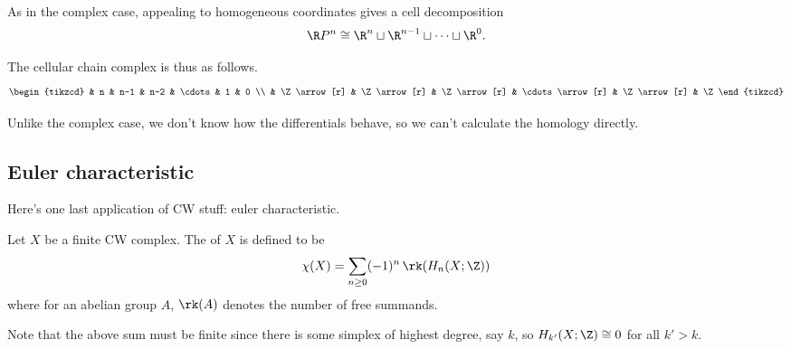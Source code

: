 \documentclass[main.tex]{subfiles}
\begin{document}
\begin{example}
  As in the complex case, appealing to homogeneous coordinates gives a cell decomposition
  \begin{equation*}
    \R P^{n} \cong \R^{n} \sqcup \R^{n-1} \sqcup \cdots \sqcup \R^{0}.
  \end{equation*}

  The cellular chain complex is thus as follows.
  \begin{equation*}
    \begin{tikzcd}
      & n
      & n-1
      & n-2
      & \cdots
      & 1
      & 0
      \\
      & \Z
      \arrow[r]
      & \Z
      \arrow[r]
      & \Z
      \arrow[r]
      & \cdots
      \arrow[r]
      & \Z
      \arrow[r]
      & \Z
    \end{tikzcd}
  \end{equation*}

  Unlike the complex case, we don't know how the differentials behave, so we can't calculate the homology directly.
\end{example}

\subsection{Euler characteristic}
\label{ssc:euler_characteristic}

Here's one last application of CW stuff: euler characteristic.

\begin{definition}
  \label{def:euler_characteristic}
  Let \(X\) be a finite CW complex. The  of \(X\) is defined to be
  \begin{equation*}
    \chi(X) = \sum_{n \geq 0} (-1)^{n}\,\rk(H_{n}(X; \Z))
  \end{equation*}
  where for an abelian group \(A\), \(\rk(A)\) denotes the number of free summands.
\end{definition}
Note that the above sum must be finite since there is some simplex of highest degree, say \(k\), so \(H_{k'}(X; \Z) \cong 0\) for all \(k' > k\).
\end{document}
